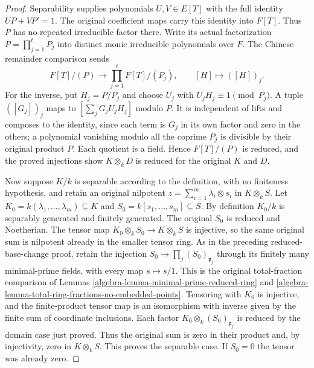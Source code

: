 \begin{proof}
Separability supplies polynomials $U,V\in E[T]$
with the full identity $UP+VP'=1$.
The original coefficient maps carry this
identity into $F[T]$. Thus $P$ has no repeated
irreducible factor there. Write its actual
factorization $P=\prod_{j=1}^t P_j$ into
distinct monic irreducible polynomials over
$F$. The Chinese remainder comparison sends
$$
F[T]/(P)\longrightarrow\prod_{j=1}^t F[T]/(P_j),
\qquad [H]\longmapsto([H])_j.
$$
For the inverse, put $H_j=P/P_j$ and choose
$U_j$ with $U_jH_j\equiv1\pmod{P_j}$.
A tuple $([G_j])_j$ maps to
$[\sum_jG_jU_jH_j]$ modulo $P$. It is
independent of lifts and composes to the
identity, since each term is $G_j$ in its
own factor and zero in the others; a
polynomial vanishing modulo all the coprime
$P_j$ is divisible by their original
product $P$. Each quotient is a field.
Hence $F[T]/(P)$ is reduced, and the
proved injections show $K\otimes_kD$
is reduced for the original $K$ and $D$.

Now suppose $K/k$ is separable according to
the definition, with no finiteness hypothesis,
and retain an original nilpotent
$z=\sum_{i=1}^m\lambda_i\otimes s_i$
in $K\otimes_kS$. Let
$K_0=k(\lambda_1,\ldots,\lambda_m)\subseteq K$
and $S_0=k[s_1,\ldots,s_m]\subseteq S$.
By definition $K_0/k$ is separably generated
and finitely generated. The original $S_0$
is reduced and Noetherian. The tensor map
$K_0\otimes_kS_0\to K\otimes_kS$ is injective,
so the same original sum is nilpotent already
in the smaller tensor ring.
As in the preceding reduced-base-change
proof, retain the injection
$S_0\to\prod_j (S_0)_{\mathfrak p_j}$
through its finitely many minimal-prime
fields, with every map $s\mapsto s/1$.
This is the original total-fraction comparison
of Lemmas \ref{algebra-lemma-minimal-prime-reduced-ring}
and \ref{algebra-lemma-total-ring-fractions-no-embedded-points}.
Tensoring with $K_0$ is injective, and the
finite-product tensor map is an isomorphism
with inverse given by the finite sum of
coordinate inclusions. Each factor
$K_0\otimes_k(S_0)_{\mathfrak p_j}$ is
reduced by the domain case just proved.
Thus the original sum is zero in their
product and, by injectivity, zero in
$K\otimes_kS$. This proves the separable case.
If $S_0=0$ the tensor was already zero.


\end{proof}
